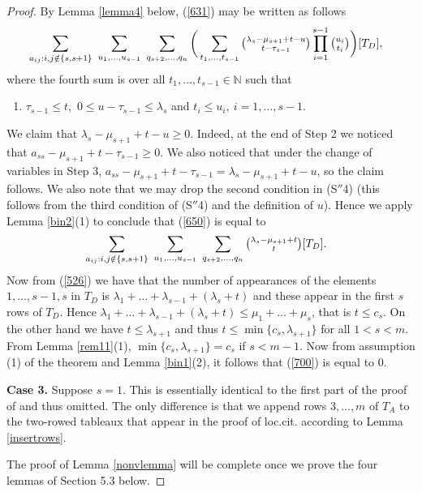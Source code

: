 \documentclass[ALCO,Unicode]{cedram}
\newcommand{\m}{\mu}
\numberwithin{equation}{section}
\begin{document}
\begin{proof}
By Lemma \ref{lemma4} below,  (\ref{631}) may be written as follows
	\begin{align}\label{650}
		&\sum_{a_{ij}: i,j \notin \{s, s+1\}} \  \sum_{u_1,\dots,u_{s-1}} \  \sum_{q_{s+2},\dots,q_{n}} \bigg( \sum_{t_1,\dots,t_{s-1}}   \tbinom{\lambda_s -\mu_{s+1}+t-u}{t-\tau_{s-1}}\prod_{i=1}^{s-1}\tbinom{u_i}{t_i}\bigg) [T_D], \end{align}	
where the fourth sum is over all $t_1,\dots,t_{s-1} \in \mathbb{N}$	such that
\begin{enumerate} \item[(S$''$4)] $\tau_{s-1} \le t$,\  $0 \le u- \tau_{s-1} \le \lambda_{s}$ and $t_i \le u_i, \ i=1,\dots,s-1.$\end{enumerate}
We claim that 	$\lambda_s -\mu_{s+1}+t-u \ge 0$. Indeed, at the end of Step 2 we noticed that $a_{ss}-\m_{s+1}+t-\tau_{s-1} \ge 0$. We also noticed that under the change of variables in Step 3, $a_{ss}-\m_{s+1}+t-\tau_{s-1}=\lambda_s -\mu_{s+1}+t-u$, so the claim  follows. We also note that we may drop the second condition in (S$''$4) (this follows from the third condition of (S$''$4) and the definition of $u$).  Hence we apply Lemma \ref{bin2}(1) to conclude that (\ref{650}) is equal to 
\begin{align}\label{700}
	&\sum_{a_{ij}: i,j \notin \{s, s+1\}} \  \sum_{u_1,\dots,u_{s-1}} \  \sum_{q_{s+2},\dots,q_{n}}   \tbinom{\lambda_s -\mu_{s+1}+t}{t}[T_D]. \end{align}				
Now from (\ref{526}) we have that the number of appearances of the elements $1,\dots,s-1,s$ in $T_D$ is $\lambda_1+\dots+\lambda_{s-1} +(\lambda_{s}+t)$ and these appear in the first $s$ rows of $T_D$. Hence $\lambda_1+\dots+\lambda_{s-1} +(\lambda_{s}+t) \le \mu_1+\dots+\mu_s$, that is $t \le c_s$. On the other hand we have $t \le \lambda_{s+1}$ and thus $t \le \min\{c_s, \lambda_{s+1}\}$ for all $1<s<m$. From Lemma \ref{rem11}(1), $\min\{c_s, \lambda_{s+1}\}=c_s$ if $s<m-1$. Now from assumption (1) of the theorem and Lemma \ref{bin1}(2), it follows that (\ref{700}) is equal to $0$.
				
	\textbf{Case 3.} Suppose $s=1$.	This is essentially identical to the first part of the proof of \cite[Theorem 3.1]{MS3} and thus omitted. The only difference is that we append rows $3,\dots,m$ of $T_A$ to the two-rowed tableaux that appear in the proof of loc.cit. according to Lemma \ref{insertrows}.
	
	The proof of Lemma \ref{nonvlemma} will be complete once we prove the four lemmas of Section 5.3 below. \end{proof}
	
\end{document}
